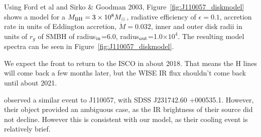 \documentclass{nature}
\begin{document}
Using Ford et al and Sirko \& Goodman 2003, Figure~\ref{fig:J110057_diskmodel}
shows a model for a $M_{\rm BH}=3\times 10^{8} M_{\odot}$, radiative
efficiency of $\epsilon=0.1$, accretion rate in units of Eddington
accretion, $\dot{M}=0.032$, inner and outer disk radii in units of
$r_g$ of SMBH of radius$_{\rm in}$=6.0, radius$_{\rm out}$=1.0$\times
10^{4}$. The resulting model spectra can be seen in
Figure~\ref{fig:J110057_diskmodel}.

We expect the front to return to the ISCO in about 2018. That
means the H lines will come back a few months later, but the WISE IR
flux shouldn't come back until about 2021.

\cite{Guo16} observed a similar event to J110057, with SDSS
J231742.60 +000535.1. However, their object provided an ambiguous
case, as the IR brightness of their source did not decline. However
this is consistent with our model, as their cooling event is
relatively brief.







%
%
\end{document}
